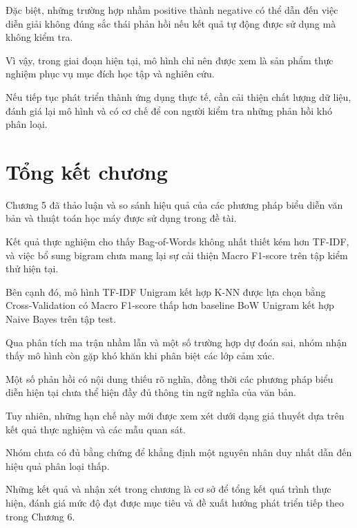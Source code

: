 Đặc biệt, những
trường hợp nhầm
positive thành
negative có thể
dẫn đến việc diễn
giải không đúng
sắc thái phản hồi
nếu kết quả tự
động được sử dụng
mà không kiểm tra.

Vì vậy, trong
giai đoạn hiện tại,
mô hình chỉ nên
được xem là sản
phẩm thực nghiệm
phục vụ mục đích
học tập và nghiên
cứu.

Nếu tiếp tục phát
triển thành ứng
dụng thực tế,
cần cải thiện
chất lượng dữ liệu,
đánh giá lại mô hình
và có cơ chế để
con người kiểm tra
những phản hồi
khó phân loại.



\section{Tổng kết chương}

Chương 5 đã thảo luận
và so sánh hiệu quả
của các phương pháp
biểu diễn văn bản
và thuật toán học máy
được sử dụng trong
đề tài.

Kết quả thực nghiệm
cho thấy Bag-of-Words
không nhất thiết kém
hơn TF-IDF, và việc
bổ sung bigram chưa
mang lại sự cải thiện
Macro F1-score trên
tập kiểm thử hiện tại.

Bên cạnh đó, mô hình
TF-IDF Unigram kết hợp
K-NN được lựa chọn bằng
Cross-Validation có
Macro F1-score thấp hơn
baseline BoW Unigram
kết hợp Naive Bayes
trên tập test.

Qua phân tích ma trận
nhầm lẫn và một số
trường hợp dự đoán sai,
nhóm nhận thấy mô hình
còn gặp khó khăn khi
phân biệt các lớp
cảm xúc.

Một số phản hồi có
nội dung thiếu rõ
nghĩa, đồng thời
các phương pháp
biểu diễn hiện tại
chưa thể hiện đầy
đủ thông tin ngữ
nghĩa của văn bản.

Tuy nhiên, những
hạn chế này mới
được xem xét dưới
dạng giả thuyết
dựa trên kết quả
thực nghiệm và
các mẫu quan sát.

Nhóm chưa có đủ
bằng chứng để khẳng
định một nguyên nhân
duy nhất dẫn đến
hiệu quả phân loại
thấp.

Những kết quả và
nhận xét trong
chương là cơ sở
để tổng kết quá
trình thực hiện,
đánh giá mức độ
đạt được mục tiêu
và đề xuất hướng
phát triển tiếp
theo trong Chương 6.
